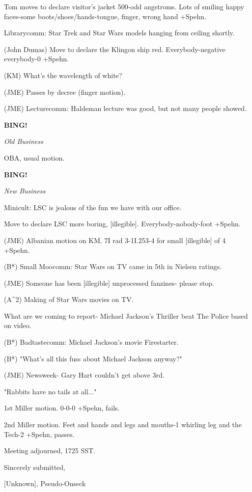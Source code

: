 \documentclass[12pt]{article}
\newcommand{\bing}{{\bf BING!} }
\newcommand{\goto}[1]{\bing \vskip 12pt \centerline{{\em{#1}}}}
\begin{document}
Tom moves to declare visitor's jacket 500-odd angstroms. Lots of smiling happy faces-some boots/shoes/hands-tongue, finger, wrong hand +Spehn.

Librarycomm: Star Trek and Star Wars models hanging from ceiling shortly.

(John Dumas) Move to declare the Klingon ship red. Everybody-negative everybody-0 +Spehn.

(KM) What's the wavelength of white?

(JME) Passes by decree (finger motion).

(JME) Lecturecomm: Haldeman lecture was good, but not many people showed.

\goto{Old Business}

OBA, usual motion.

\goto{New Business}

Minicult: LSC is jealous of the fun we have with our office.

Move to declare LSC more boring, [illegible]. Everybody-nobody-foot +Spehn.

(JME) Albanian motion on KM. 7I rad 3-1I.253-4 for small [illegible] of 4 +Spehn.

(B*) Small Moocomm: Star Wars on TV came in 5th in Nielsen ratings.

(JME) Someone has been [illegible] unprocessed fanzines- please stop.

(A^2) Making of Star Wars movies on TV.

What are we coming to report- Michael Jackson's Thriller beat The Police based on video.

(B*) Badtastecomm: Michael Jackson's movie Firestarter.

(B*) "What's all this fuss about Michael Jackson anyway?"

(JME) Newsweek- Gary Hart couldn't get above 3rd.

"Rabbits have no tails at all..."

1st Miller motion. 0-0-0 +Spehn, fails.

2nd Miller motion. Feet and hands and legs and mouths-1 whirling leg and the Tech-2 +Spehn, passes.

\vspace{12pt}

\noindent
Meeting adjourned, 1725 SST.

\vspace{18pt}

\centerline{Sincerely submitted,}
\centerline{[Unknown], Pseudo-Onseck}
\end{document}
